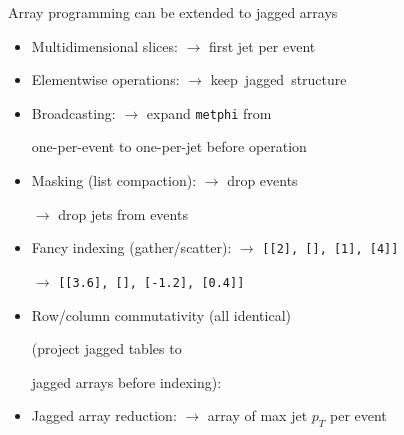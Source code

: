 \documentclass[aspectratio=169]{beamer}
\begin{document}
\begin{frame}{Array programming can be extended to jagged arrays}
\vspace{0.2 cm}
\begin{itemize}\setlength{\itemsep}{0.15 cm}
\item Multidimensional slices:  $\to$ first jet per event
\item<2-> Elementwise operations:  $\to$ \mbox{keep jagged structure\hspace{-1 cm}}
\item<3-> Broadcasting:  $\to$ expand {\small \texttt{metphi}} from

\tabto{5.5 cm}one-per-event to one-per-jet before operation

\item<4-> Masking (list compaction):  $\to$ drop events

 $\to$ drop jets from events

\item<5-> Fancy indexing (gather/scatter):  $\to$ \mbox{\small \texttt{[[2], [], [1], [4]]}\hspace{-0.5 cm}}

 $\to$ \mbox{\small \texttt{[[3.6], [], [-1.2], [0.4]]}\hspace{-0.5 cm}}

\item<6-> Row/column commutativity  (all identical)

(project jagged tables to 

jagged arrays before indexing): 



\item<7-> Jagged array reduction:  $\to$ array of max jet $p_T$ per event
\end{itemize}
\end{frame}
\end{document}
